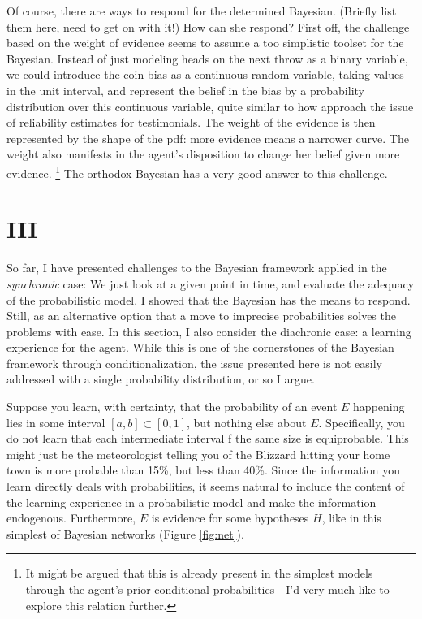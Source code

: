 \documentclass[11pt, a4paper]{scrartcl}
\begin{document}
Of course, there are ways to respond for the determined Bayesian. (Briefly list them here, need to get on with it!) How can she respond? First off, the challenge based on the weight of evidence seems to assume a too simplistic toolset for the Bayesian. Instead of just modeling heads on the next throw as a binary variable, we could introduce the coin bias as a continuous random variable, taking values in the unit interval, and represent the belief in the bias by a probability distribution over this continuous variable, quite similar to how \citet{Olsson2013} approach the issue of reliability estimates for testimonials. The weight of the evidence is then represented by the shape of the pdf: more evidence means a narrower curve. The weight also manifests in the agent's disposition to change her belief given more evidence. \footnote{It might be argued that this is already present in the simplest models through the agent's prior conditional probabilities - I'd very much like to explore this relation further.} The orthodox Bayesian has a very good answer to this challenge.  



\section{III}

So far, I have presented challenges to the Bayesian framework applied in the \emph{synchronic} case: We just look at a given point in time, and evaluate the adequacy of the probabilistic model. I showed that the Bayesian has the means to respond. Still, as an alternative option that a move to imprecise probabilities solves the problems with ease. In this section, I also consider the diachronic case: a learning experience for the agent. While this is one of the cornerstones of the Bayesian framework through conditionalization, the issue presented here is not easily addressed with a single probability distribution, or so I argue. 

Suppose you learn, with certainty, that the probability of an event $E$ happening lies in some interval $[a,b] \subset [0,1]$, but nothing else about $E$. Specifically, you do not learn that each intermediate interval f the same size is equiprobable. This might just be the meteorologist telling you of the Blizzard hitting your home town is more probable than 15\%, but less than 40\%. Since the information you learn directly deals with probabilities, it seems natural to include the content of the learning experience in a probabilistic model and make the information endogenous. Furthermore, $E$ is evidence for some hypotheses $H$, like in this simplest of Bayesian networks (Figure \ref{fig:net}). 
\end{document}
